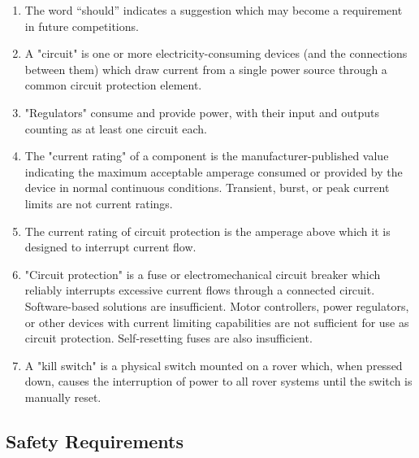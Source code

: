     \begin{enumerate}
        \item The word “should” indicates a suggestion which may become a requirement in future competitions.
        \item A "circuit" is one or more electricity-consuming devices (and the connections between them) which draw current from a single power source through a common circuit protection element.
        \item "Regulators" consume and provide power, with their input and outputs counting as at least one circuit each.
        \item The "current rating" of a component is the manufacturer-published value indicating the maximum acceptable amperage consumed or provided by the device in normal continuous conditions. Transient, burst, or peak current limits are not current ratings.
        \item The current rating of circuit protection is the amperage above which it is designed to interrupt current flow.
        \item "Circuit protection" is a fuse or electromechanical circuit breaker which reliably interrupts excessive current flows through a connected circuit. Software-based solutions are insufficient. Motor controllers, power regulators, or other devices with current limiting capabilities are not sufficient for use as circuit protection. Self-resetting fuses are also insufficient.
        \item A "kill switch" is a physical switch mounted on a rover which, when pressed down, causes the interruption of power to all rover systems until the switch is manually reset.
    \end{enumerate}

\subsection{Safety Requirements}


